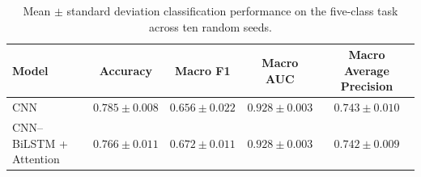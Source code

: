 \begin{table}[htbp]
\centering
\begin{tabular}{lcccc}
\toprule
Model & Accuracy & Macro F1 & Macro AUC & Macro Average Precision \\
\midrule
CNN                        & $0.785 \pm 0.008$ & $0.656 \pm 0.022$ & $0.928 \pm 0.003$ & $0.743 \pm 0.010$ \\
CNN--BiLSTM + Attention    & $0.766 \pm 0.011$ & $0.672 \pm 0.011$ & $0.928 \pm 0.003$ & $0.742 \pm 0.009$ \\
\bottomrule
\end{tabular}
\caption{Mean $\pm$ standard deviation classification performance on the five-class task across ten random seeds.}
\label{tab:fiveclass_summary}
\end{table}
